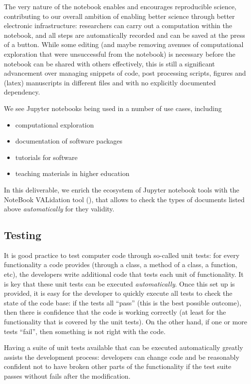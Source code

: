 \documentclass{deliverablereport}
\begin{document}
The very nature of the notebook enables and encourages reproducible
science, contributing to our overall ambition of enabling better
science through better electronic infrastructure: researchers can
carry out a computation within the notebook, and all steps are
automatically recorded and can be saved at the press of a
button. While some editing (and maybe removing avenues of
computational exploration that were unsuccessful from the notebook) is
necessary before the notebook can be shared with others effectively,
this is still a significant advancement over managing snippets of
code, post processing scripts, figures and (latex) manuscripts in
different files and with no explicitly documented dependency.

We see Jupyter notebooks being used in a number of use cases, including
\begin{itemize}
\item computational exploration
\item documentation of software packages
\item tutorials for software
\item teaching materials in higher education
\end{itemize}

In this deliverable, we enrich the ecosystem of Jupyter notebook tools
with the NoteBook VALidation tool (\nbval), that allows to check the
types of documents listed above \emph{automatically} for they validity.

\subsection{Testing} %
\label{sec:testing}


It is good practice to test computer code through so-called unit
tests: for every functionality a code provides (through a class, a
method of a class, a function, etc), the developers write additional
code that tests each unit of functionality. It is key that these unit
tests can be executed \emph{automatically}. Once this set up is
provided, it is easy for the developer to quickly execute all tests to
check the state of the code base: if the tests all ``pass'' (this is
the best possible outcome), then there is confidence that the code is
working correctly (at least for the functionality that is covered by
the unit tests). On the other hand, if one or more tests ``fail'',
then something is not right with the code.

Having a suite of unit tests available that can be executed
automatically greatly assists the development process: developers can
change code and be reasonably confident not to have broken other parts
of the functionality if the test suite passes without fails after the
modification.
\end{document}
